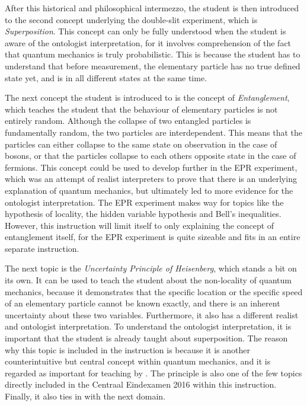 \documentclass[11pt,twoside]{report} %
\begin{document}
After this historical and philosophical intermezzo, the student is then introduced to the second concept underlying the double-slit experiment, which is \emph{Superposition}. This concept can only be fully understood when the student is aware of the ontologist interpretation, for it involves comprehension of the fact that quantum mechanics is truly probabilistic. This is because the student has to understand that before measurement, the elementary particle has no true defined state yet, and is in all different states at the same time.

The next concept the student is introduced to is the concept of \emph{Entanglement}, which teaches the student that the behaviour of elementary particles is not entirely random. Although the collapse of two entangled particles is fundamentally random, the two particles are interdependent. This means that the particles can either collapse to the same state on observation in the case of bosons, or that the particles collapse to each others opposite state in the case of fermions. This concept could be used to develop further in the EPR experiment, which was an attempt of realist interpreters to prove that there is an underlying explanation of quantum mechanics, but ultimately led to more evidence for the ontologist interpretation. The EPR experiment makes way for topics like the hypothesis of locality, the hidden variable hypothesis and Bell's inequalities. However, this instruction will limit itself to only explaining the concept of entanglement itself, for the EPR experiment is quite sizeable and fits in an entire separate instruction.

The next topic is the \emph{Uncertainty Principle of Heisenberg}, which stands a bit on its own. It can be used to teach the student about the non-locality of quantum mechanics, because it demonstrates that the specific location or the specific speed of an elementary particle cannot be known exactly, and there is an inherent uncertainty about these two variables. Furthermore, it also has a different realist and ontologist interpretation. To understand the ontologist interpretation, it is important that the student is already taught about superposition. The reason why this topic is included in the instruction is because it is another counterintuitive but central concept within quantum mechanics, and it is regarded as important for teaching by . The principle is also one of the few topics directly included in the Centraal Eindexamen 2016 \cite{eindexamen2016} within this instruction. Finally, it also ties in with the next domain.
\end{document}
